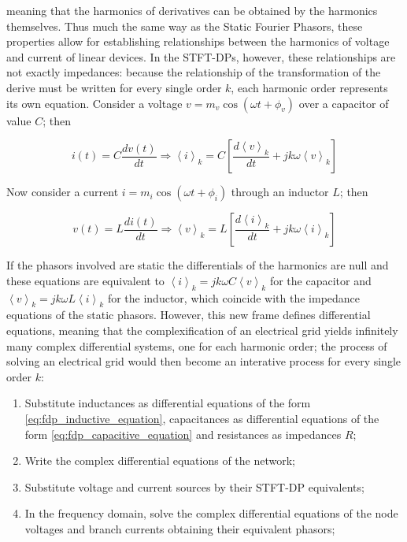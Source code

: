 	\noindent meaning that the harmonics of derivatives can be obtained by the harmonics themselves. Thus much the same way as the Static Fourier Phasors, these properties allow for establishing relationships between the harmonics of voltage and current of linear devices. In the STFT-DPs, however, these relationships are not exactly impedances: because the relationship of the transformation of the derive must be written for every single order $k$, each harmonic order represents its own equation. Consider a voltage $v = m_v\cos\left(\omega t + \phi_v\right)$ over a capacitor of value $C$; then

\begin{equation} i(t) = C\dfrac{dv(t)}{dt} \Rightarrow \left\langle i\right\rangle_k = C\left[ \dfrac{d\left\langle v\right\rangle_k}{dt} + jk\omega\left\langle v\right\rangle_k\right] \label{eq:fdp_capacitive_equation}\end{equation}

	Now consider a current $i = m_i\cos\left(\omega t + \phi_i\right)$ through an inductor $L$; then

\begin{equation} v(t) = L\dfrac{di(t)}{dt} \Rightarrow \left\langle v\right\rangle_k = L\left[ \dfrac{d\left\langle i\right\rangle_k}{dt} + jk\omega\left\langle i\right\rangle_k\right] \label{eq:fdp_inductive_equation} \end{equation}

	If the phasors involved are static the differentials of the harmonics are null and these equations are equivalent to $\left\langle i\right\rangle_k = jk\omega C\left\langle v\right\rangle_k$ for the capacitor and  $\left\langle v\right\rangle_k = jk\omega L\left\langle i\right\rangle_k$ for the inductor, which coincide with the impedance equations of the static phasors. However, this new frame defines differential equations, meaning that the complexification of an electrical grid yields infinitely many complex differential systems, one for each harmonic order; the process of solving an electrical grid would then become an interative process for every single order $k$:

\begin{enumerate}
	\item Substitute inductances as differential equations of the form \eqref{eq:fdp_inductive_equation}, capacitances as differential equations of the form \eqref{eq:fdp_capacitive_equation}  and resistances as impedances $R$;
	\item Write the complex differential equations of the network;
	\item Substitute voltage and current sources by their STFT-DP equivalents;
	\item In the frequency domain, solve the complex differential equations of the node voltages and branch currents obtaining their equivalent phasors;
\end{enumerate}

